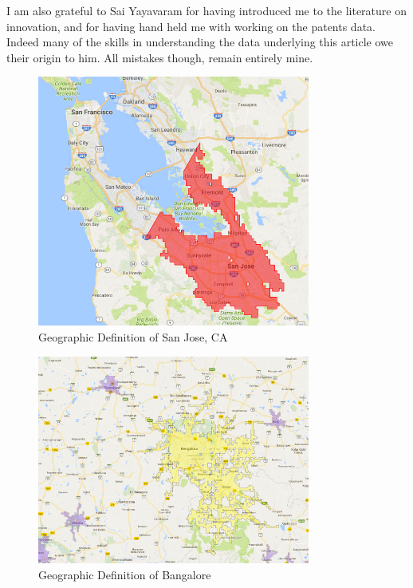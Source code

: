 \documentclass[12pt]{article}
\begin{document}
I am also grateful to Sai Yayavaram for having introduced me to the literature on innovation, and for having hand held me with working on the patents data. Indeed many of the skills in understanding the data underlying this article owe their origin to him. All mistakes though, remain entirely mine.

\newpage
 



\appendix
\singlespacing
\normalsize
\newpage
\begin{figure}[h!]
\begin{centering}
  \includegraphics[width=0.8\textwidth]{SanJose}
  \caption{Geographic Definition of San Jose, CA}
   \label{fig:SanJose}
\end{centering}
\end{figure}

\begin{figure}[h!]
\begin{centering}
  \includegraphics[width=0.8\textwidth]{Bangalore}
  \caption{Geographic Definition of Bangalore}
   \label{fig:Bangalore}
\end{centering}
\end{figure}
\end{document}
